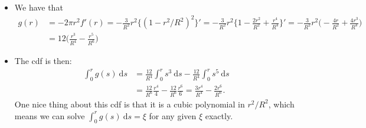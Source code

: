 \documentclass[10pt]{article}
\newcommand{\dee}{\mathrm{d}}
\begin{document}
\begin{itemize}
	\item We have that 
		\begin{align*}
			g(r) 
			&= -2\pi r^2 f'(r) = -\frac{3}{R^2} r^2 \{ (1 - r^2/R^2)^2 \}'
			= -\frac{3}{R^2} r^2 \bigg\{ 1 - \frac{2r^2}{R^2} + \frac{r^4}{R^4} \bigg\}'
			= -\frac{3}{R^2} r^2 \bigg(  -\frac{4r}{R^2} + \frac{4r^3}{R^4} \bigg)\\
			&= 12 \bigg( \frac{r^3}{R^4} - \frac{r^5}{R^6} \bigg)
		\end{align*}
		
	\item The cdf is then:
		\begin{align*}
			\int_0^r g(s)\ \dee s 
			&= \frac{12}{R^4} \int_0^r s^3\ \dee s - 
			\frac{12}{R^4} \int_0^r s^5\ \dee s\\
			&= \frac{12}{R^6} \frac{r^4}{4} 
				- \frac{12}{R^6}\frac{r^6}{6}
			= \frac{3r^4}{R^4} - \frac{2r^6}{R^6}.
		\end{align*}
		One nice thing about this cdf is that it is a cubic polynomial
		in $r^2/R^2$, which means we can solve $\int_0^r g(s)\ \dee s = \xi$
		for any given $\xi$ exactly.
\end{itemize}
\end{document}
